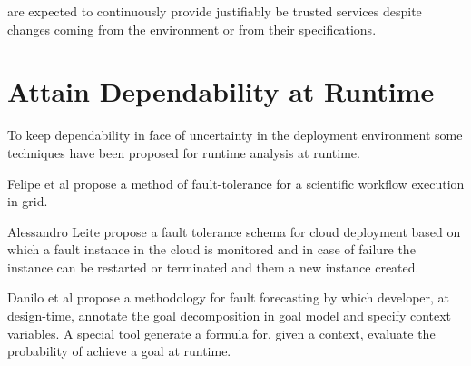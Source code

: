 

 \cite{laprie_dependability_2008} are expected to continuously provide justifiably be trusted services despite changes coming from the environment or from their specifications.


\section{Attain Dependability at Runtime }
To keep dependability in face of uncertainty in the deployment environment some techniques have been proposed for runtime analysis at runtime.


Felipe et al\cite{guimaraes_framework_2013} propose a method of fault-tolerance for a scientific workflow execution in grid.

Alessandro Leite \cite{ferreira_leite_user_2014} propose a fault tolerance schema for cloud deployment based on which a fault instance in the cloud is monitored and in case of failure the instance can be restarted or terminated and them a new instance created.

Danilo et al\cite{mendonca_dependability_2015} propose a methodology for fault forecasting by which developer, at design-time, annotate the goal decomposition in goal model and specify context variables. A special tool generate a formula for, given a context, evaluate the probability of achieve a goal at runtime.



